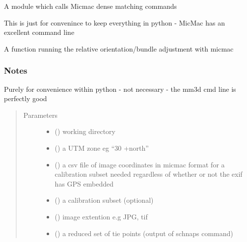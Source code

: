 \documentclass[letterpaper,10pt,english]{sphinxmanual}
\begin{document}
A module which calls Micmac dense matching commands

This is just for convenince  to keep everything in python - MicMac has an
excellent command line


\begin{fulllineitems}
\label{\detokenize{pycmac:orientation.bundle_adjust}}
A function running the relative orientation/bundle adjustment with micmac
\subsubsection*{Notes}

Purely for convenience within python - not  necessary - the mm3d cmd line
is perfectly good
\begin{quote}\begin{description}
\item[{Parameters}] \leavevmode\begin{itemize}
\item {} 
 () \textendash{} working directory

\item {} 
 () \textendash{} a UTM zone eg “30 +north”

\item {} 
 () \textendash{} a csv file of image coordinates in micmac format for a calibration subset
needed regardless of whether or not the exif has GPS embedded

\item {} 
 () \textendash{} a calibration subset (optional)

\item {} 
 () \textendash{} image extention e.g JPG, tif

\item {} 
 () \textendash{} a reduced set of tie points (output of schnaps command)


\end{itemize}
\end{description}
\end{quote}
\end{fulllineitems}
\end{document}
